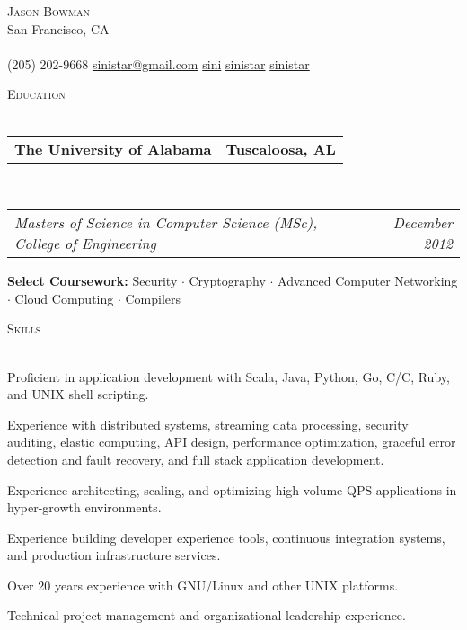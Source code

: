 \documentclass[10pt,letterpaper]{article}
\makeatletter
\newcommand{\area}[2]{\textbf{#1:}   #2}
\newcommand{\lineunder}{\vspace*{-8pt} \\ \hspace*{-18pt} \hrulefill \\}
\newcommand{\header}[1]{{\hspace*{-15pt}\vspace*{6pt} \textsc{#1}} \vspace*{-6pt} \lineunder}
\newcommand{\contact}[3]{
\vspace*{-8pt}
\begin{center}
{\LARGE \scshape {#1}}\\
#2 \lineunder 
#3
\end{center}
\vspace*{-8pt}
}
\newcommand{\headerrow}[2]
{\begin{tabular*}{\linewidth}{l@{\extracolsep{\fill}}r}
	#1 &
	#2 \\
\end{tabular*}}
\newcommand{\CPP}
{C\nolinebreak[4]\hspace{-.05em}\raisebox{.22ex}{\footnotesize\bf ++}}
\newcommand{\education}[5]{
	\headerrow
		{\textbf{#1}}
		{\textbf{#2}}
	\\
	\headerrow
		{\emph{#3}}
		{\emph{#4}}
	\begin{itemize*}
		\item #5
	\end{itemize*}
}
\makeatother
\begin{document}
\small
\smallskip
\vspace*{-30pt}

\contact{Jason Bowman}
{San Francisco, CA}
{\faPhone \hspace{0.1em} (205) 202-9668 \hspace{0.1em} \faEnvelope \hspace{0.1em}
  \href{mailto:sinistar@gmail.com}{sinistar@gmail.com} \hspace{0.1em} \faGithub \hspace{0.1em} \href{https://www.github.com/sini}{sini} \hspace{0.1em} \faTwitter
  \hspace{0.1em} \href{https://www.twitter.com/sinistar}{sinistar} \hspace{0.1em} \faLinkedin \hspace{0.1em}
  \href{https://linkedin.com/in/sinistar}{sinistar}}

\vspace*{3pt}

\header{Education}
\education{The University of Alabama}{Tuscaloosa, AL}{Masters of Science in
  Computer Science (MSc), College of Engineering}{December 2012}{\area{Select
    Coursework}{Security $\cdot$ Cryptography $\cdot$ Advanced Computer
    Networking $\cdot$ Cloud Computing $\cdot$ Compilers}}


\vspace*{3pt}

\header{Skills}
\begin{itemize*}
\item Proficient in application development with Scala, Java, Python, Go, C/\CPP, Ruby, and UNIX shell scripting. 
\item Experience with distributed systems, streaming data processing, security auditing, elastic
  computing, API design, performance optimization, graceful error detection and
  fault recovery, and full stack application development.
\item Experience architecting, scaling, and optimizing high volume QPS applications in hyper-growth environments.
\item Experience building developer experience tools, continuous integration
  systems, and production infrastructure services.
\item Over 20 years experience with GNU/Linux and other UNIX platforms.
\item Technical project management and organizational leadership experience.
\end{itemize*}
\vspace*{3pt}
\end{document}
